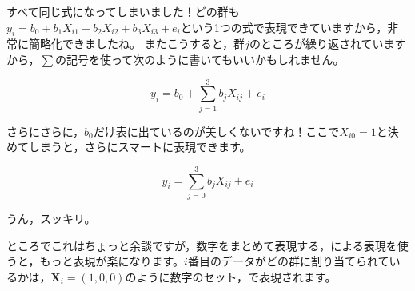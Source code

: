 \documentclass{ltjbook}
\begin{document}
すべて同じ式になってしまいました！どの群も$y_{i} = b_0 + b_1X_{i1} + b_2X_{i2} + b_3X_{i3} + e_i $という1つの式で表現できていますから，非常に簡略化できましたね。
またこうすると，群$j$のところが繰り返されていますから，$\sum$の記号を使って次のように書いてもいいかもしれません。

\[ y_i = b_0 + \sum_{j=1}^3 b_j X_{ij} + e_i \]

さらにさらに，$b_0$だけ表に出ているのが美しくないですね！ここで$X_{i0}=1$と決めてしまうと，さらにスマートに表現できます。

\[ y_i = \sum_{j=0}^3 b_j X_{ij} + e_i \]

うん，スッキリ。

ところでこれはちょっと余談ですが，数字をまとめて表現する，による表現を使うと，もっと表現が楽になります。$i$番目のデータがどの群に割り当てられているかは，$\bm{X}_i = (1,0,0) $のように数字のセット，で表現されます。
\end{document}
